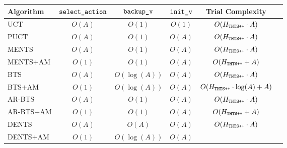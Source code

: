     \begin{table}[tbp]
        \centering   
            {%
            \setlength{\tabcolsep}{4pt}%
            \fontsize{12}{14.5}\selectfont
        \begin{tabular}{l|ccccc}
            Algorithm 
                & ${\textnormal{\texttt{select\_action}}}$ 
                & ${\textnormal{\texttt{backup\_v}}}$ 
                & ${\textnormal{\texttt{init\_v}}}$ 
                & Trial Complexity \\
            \hline
            UCT 
                & $O(A)$ 
                & $O(1)$ 
                & $O(1)$
                & $O(H_{{\textnormal{\texttt{THTS++}}}}\cdot A)$ \\
            PUCT 
                & $O(A)$ 
                & $O(1)$ 
                & $O(A)$ 
                & $O(H_{{\textnormal{\texttt{THTS++}}}}\cdot A)$ \\
            MENTS 
                & $O(A)$ 
                & $O(1)$ 
                & $O(A)$ 
                & $O(H_{{\textnormal{\texttt{THTS++}}}}\cdot A)$ \\
            MENTS$+$AM 
                & $O(1)$ 
                & $O(1)$ 
                & $O(A)$ 
                & $O(H_{{\textnormal{\texttt{THTS++}}}}+A)$ \\
            BTS 
                & $O(A)$ 
                & $O(\log(A))$ 
                & $O(A)$ 
                & $O(H_{{\textnormal{\texttt{THTS++}}}}\cdot A)$ \\
            BTS$+$AM 
                & $O(1)$ 
                & $O(\log(A))$
                & $O(A)$ 
                & $O(H_{{\textnormal{\texttt{THTS++}}}}\cdot \log(A)+A)$ \\
            AR-BTS 
                & $O(A)$ 
                & $O(1)$ 
                & $O(A)$ 
                & $O(H_{{\textnormal{\texttt{THTS++}}}}\cdot A)$ \\
            AR-BTS$+$AM 
                & $O(1)$ 
                & $O(1)$
                & $O(A)$ 
                & $O(H_{{\textnormal{\texttt{THTS++}}}}+A)$ \\
            DENTS 
                & $O(A)$ 
                & $O(A)$ 
                & $O(A)$ 
                & $O(H_{{\textnormal{\texttt{THTS++}}}}\cdot A)$ \\
            DENTS$+$AM 
                & $O(1)$ 
                & $O(\log(A))$
                & $O(A)$ 

\end{tabular}}
\end{table}
